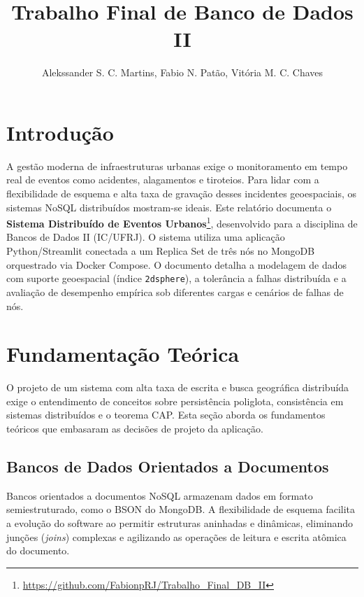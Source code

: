 \documentclass[12pt]{article}
\title{Trabalho Final de Banco de Dados II}
\author{Alekssander S. C. Martins\inst{1}, Fabio N. Patão\inst{1}, Vitória M. C. Chaves\inst{1}}
\begin{document}
\maketitle

\section{Introdução}
\label{sec:intro}

A gestão moderna de infraestruturas urbanas exige o monitoramento em tempo real de eventos como acidentes, alagamentos e tiroteios. Para lidar com a flexibilidade de esquema e alta taxa de gravação desses incidentes geoespaciais, os sistemas NoSQL distribuídos mostram-se ideais. Este relatório documenta o \textbf{Sistema Distribuído de Eventos Urbanos}\footnote{\url{https://github.com/FabionpRJ/Trabalho_Final_DB_II}}, desenvolvido para a disciplina de Bancos de Dados II (IC/UFRJ). O sistema utiliza uma aplicação Python/Streamlit conectada a um Replica Set de três nós no MongoDB orquestrado via Docker Compose. O documento detalha a modelagem de dados com suporte geoespacial (índice \texttt{2dsphere}), a tolerância a falhas distribuída e a avaliação de desempenho empírica sob diferentes cargas e cenários de falhas de nós.

\section{Fundamentação Teórica}
\label{sec:teoria}

O projeto de um sistema com alta taxa de escrita e busca geográfica distribuída exige o entendimento de conceitos sobre persistência poliglota, consistência em sistemas distribuídos e o teorema CAP. Esta seção aborda os fundamentos teóricos que embasaram as decisões de projeto da aplicação.

\subsection{Bancos de Dados Orientados a Documentos}

Bancos orientados a documentos NoSQL armazenam dados em formato semiestruturado, como o BSON do MongoDB. A flexibilidade de esquema facilita a evolução do software ao permitir estruturas aninhadas e dinâmicas, eliminando junções (\textit{joins}) complexas e agilizando as operações de leitura e escrita atômica do documento.
\end{document}
